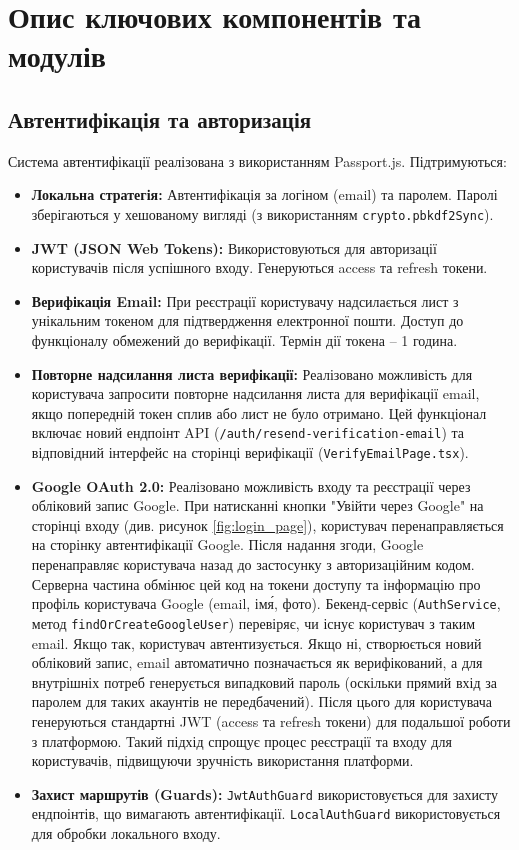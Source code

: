 \section{Опис ключових компонентів та модулів}
\label{sec:key_components}

\subsection{Автентифікація та авторизація}
Система автентифікації реалізована з використанням Passport.js. Підтримуються:
\begin{itemize}
    \item \textbf{Локальна стратегія:} Автентифікація за логіном (email) та паролем. Паролі зберігаються у хешованому вигляді (з використанням \texttt{crypto.pbkdf2Sync}).
    \item \textbf{JWT (JSON Web Tokens):} Використовуються для авторизації користувачів після успішного входу. Генеруються access та refresh токени.
    \item \textbf{Верифікація Email:} При реєстрації користувачу надсилається лист з унікальним токеном для підтвердження електронної пошти. Доступ до функціоналу обмежений до верифікації. Термін дії токена -- 1 година.
    \item \textbf{Повторне надсилання листа верифікації:} Реалізовано можливість для користувача запросити повторне надсилання листа для верифікації email, якщо попередній токен сплив або лист не було отримано. Цей функціонал включає новий ендпоінт API (\texttt{/auth/resend-verification-email}) та відповідний інтерфейс на сторінці верифікації (\texttt{VerifyEmailPage.tsx}).
    \item \textbf{Google OAuth 2.0:} Реалізовано можливість входу та реєстрації через обліковий запис Google. При натисканні кнопки "Увійти через Google" на сторінці входу (див. рисунок \ref{fig:login_page}), користувач перенаправляється на сторінку автентифікації Google. Після надання згоди, Google перенаправляє користувача назад до застосунку з авторизаційним кодом. Серверна частина обмінює цей код на токени доступу та інформацію про профіль користувача Google (email, ім\'я, фото). Бекенд-сервіс (\texttt{AuthService}, метод \texttt{findOrCreateGoogleUser}) перевіряє, чи існує користувач з таким email. Якщо так, користувач автентизується. Якщо ні, створюється новий обліковий запис, email автоматично позначається як верифікований, а для внутрішніх потреб генерується випадковий пароль (оскільки прямий вхід за паролем для таких акаунтів не передбачений). Після цього для користувача генеруються стандартні JWT (access та refresh токени) для подальшої роботи з платформою. Такий підхід спрощує процес реєстрації та входу для користувачів, підвищуючи зручність використання платформи.
    \item \textbf{Захист маршрутів (Guards):} \texttt{JwtAuthGuard} використовується для захисту ендпоінтів, що вимагають автентифікації. \texttt{LocalAuthGuard} використовується для обробки локального входу.
\end{itemize}

